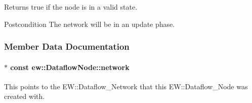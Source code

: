 \label{classew_1_1DataflowNode_ab107e9b827f2ce8e9875fff5f90723b0}
\begin{DoxyReturn}{Returns}
{\ttfamily true} if the node is in a valid state. 
\end{DoxyReturn}
\begin{DoxyPostcond}{Postcondition}
The network will be in an update phase. 
\end{DoxyPostcond}


\subsubsection{Member Data Documentation}
\hypertarget{classew_1_1DataflowNode_af3e8a9a18dac03806dda98ed1fcc79e9}{
\paragraph[{network}]{$\ast$ const {\bf ew::DataflowNode::network}}\hfill}
\label{classew_1_1DataflowNode_af3e8a9a18dac03806dda98ed1fcc79e9}
This points to the EW::Dataflow\_\-Network that this EW::Dataflow\_\-Node was created with. 